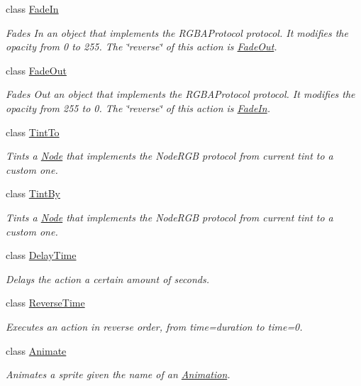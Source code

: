 \begin{DoxyCompactItemize}
class \hyperlink{classFadeIn}{Fade\+In}
\begin{DoxyCompactList}\small\item\em Fades In an object that implements the R\+G\+B\+A\+Protocol protocol. It modifies the opacity from 0 to 255. The \char`\"{}reverse\char`\"{} of this action is \hyperlink{classFadeOut}{Fade\+Out}. \end{DoxyCompactList}\item 
class \hyperlink{classFadeOut}{Fade\+Out}
\begin{DoxyCompactList}\small\item\em Fades Out an object that implements the R\+G\+B\+A\+Protocol protocol. It modifies the opacity from 255 to 0. The \char`\"{}reverse\char`\"{} of this action is \hyperlink{classFadeIn}{Fade\+In}. \end{DoxyCompactList}\item 
class \hyperlink{classTintTo}{Tint\+To}
\begin{DoxyCompactList}\small\item\em Tints a \hyperlink{classNode}{Node} that implements the Node\+R\+GB protocol from current tint to a custom one. \end{DoxyCompactList}\item 
class \hyperlink{classTintBy}{Tint\+By}
\begin{DoxyCompactList}\small\item\em Tints a \hyperlink{classNode}{Node} that implements the Node\+R\+GB protocol from current tint to a custom one. \end{DoxyCompactList}\item 
class \hyperlink{classDelayTime}{Delay\+Time}
\begin{DoxyCompactList}\small\item\em Delays the action a certain amount of seconds. \end{DoxyCompactList}\item 
class \hyperlink{classReverseTime}{Reverse\+Time}
\begin{DoxyCompactList}\small\item\em Executes an action in reverse order, from time=duration to time=0. \end{DoxyCompactList}\item 
class \hyperlink{classAnimate}{Animate}
\begin{DoxyCompactList}\small\item\em Animates a sprite given the name of an \hyperlink{classAnimation}{Animation}. \end{DoxyCompactList}\item 

\end{DoxyCompactItemize}
